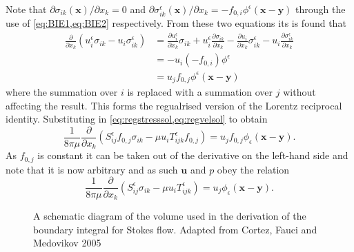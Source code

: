 Note that $\partial \sigma_{ik}(\bm{x})/ \partial x_k = 0$ and $\partial \sigma^\epsilon_{ik}(\bm{x})/ \partial x_k = -f_{0,i}\phi^\epsilon(\bm{x}-\bm{y})$ through the use of \cref{eq:BIE1,eq:BIE2} respectively. From these two equations its is found that
\begin{equation*}
\begin{aligned}
  \frac{\partial}{\partial x_k}(u^\epsilon_i\sigma_{ik} - u_i\sigma^\epsilon_{ik}) &=
  \frac{\partial u^\epsilon_i}{\partial x_k} \sigma_{ik} + u^\epsilon_i\frac{\partial \sigma_{ik}}{\partial x_k} - \frac{\partial u_i}{\partial x_k} \sigma^\epsilon_{ik} - u_i\frac{\partial \sigma^\epsilon_{ik}}{\partial x_k}  \\
  & = - u_i(-f_{0,i})\phi^\epsilon  \\
  &= u_j f_{0,j}\phi^\epsilon(\bm{x}-\bm{y})
\end{aligned}
\end{equation*}
where the summation over $i$ is replaced with a summation over $j$ without affecting the result. This forms the regualrised version of the Lorentz reciprocal identity. Substituting in \cref{eq:regstresssol,eq:regvelsol} to obtain
\begin{equation*}
  \frac{1}{8\pi\mu}\frac{\partial}{\partial x_k}(S^\epsilon_{ij}f_{0,j}\sigma_{ik} - \mu u_i T^\epsilon_{ijk}f_{0,j}) = u_j f_{0,j}\phi_\epsilon(\bm{x}-\bm{y}).
\end{equation*}
As $f_{0,j}$ is constant it can be taken out of the derivative on the left-hand side and note that it is now arbitrary and as such $\bm{u}$ and $p$ obey the relation
\begin{equation}
  \label{eq:reciprocalrelation}
  \frac{1}{8\pi\mu}\frac{\partial}{\partial x_k}(S^\epsilon_{ij}\sigma_{ik} - \mu u_i T^\epsilon_{ijk}) = u_j\phi_\epsilon(\bm{x}-\bm{y}).
\end{equation}

\begin{figure}
    \centering
    \resizebox{.4\linewidth}{!}{}
    \caption{A schematic diagram of the volume used in the derivation of the boundary integral for Stokes flow. Adapted from Cortez, Fauci and Medovikov 2005 \cite{Cortez2005}}
    \label{fig:SystematicDiagram}
\end{figure}

